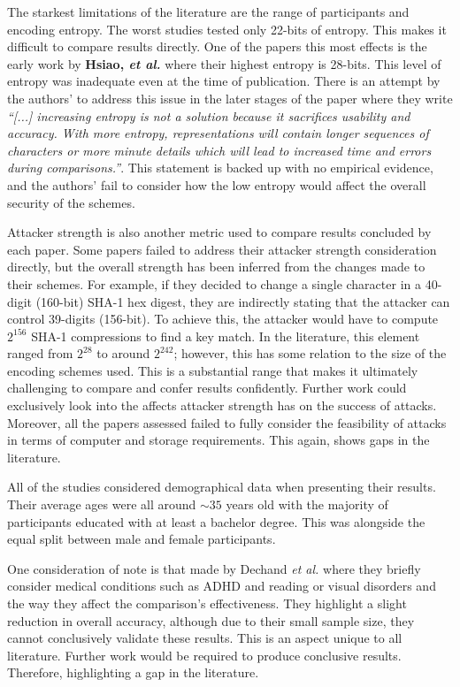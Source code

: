 The starkest limitations of the literature are the range of participants and encoding entropy. The worst studies tested only 22-bits of entropy. This makes it difficult to compare results directly. One of the papers this most effects is the early work by \textbf{Hsiao, \textit{et al.}}\cite{hsiao2009study}  where their highest entropy is 28-bits. This level of entropy was inadequate even at the time of publication. There is an attempt by the authors' to address this issue in the later stages of the paper where they write \textit{``[...] increasing entropy is not a solution because it sacrifices usability and accuracy. With more entropy, representations will contain longer sequences of characters or more minute details which will lead to increased time and errors during comparisons.''}. This statement is backed up with no empirical evidence, and the authors' fail to consider how the low entropy would affect the overall security of the schemes.

Attacker strength is also another metric used to compare results concluded by each paper. Some papers failed to address their attacker strength consideration directly, but the overall strength has been inferred from the changes made to their schemes. For example, if they decided to change a single character in a 40-digit (160-bit) SHA-1 hex digest, they are indirectly stating that the attacker can control 39-digits (156-bit). To achieve this, the attacker would have to compute $2^{156}$ SHA-1 compressions to find a key match.
In the literature, this element ranged from $2^{28}$ to around $2^{242}$; however, this has some relation to the size of the encoding schemes used. This is a substantial range that makes it ultimately challenging to compare and confer results confidently. Further work could exclusively look into the affects attacker strength has on the success of attacks. Moreover, all the papers assessed failed to fully consider the feasibility of attacks in terms of computer and storage requirements. This again, shows gaps in the literature. 

All of the studies considered demographical data when presenting their results. Their average ages were all around $\sim35$ years old with the majority of participants educated with at least a bachelor degree. This was alongside the equal split between male and female participants.

One consideration of note is that made by Dechand \textit{et al.} \cite{dechand2016empirical} where they briefly consider medical conditions such as ADHD and reading or visual disorders and the way they affect the comparison's effectiveness. They highlight a slight reduction in overall accuracy, although due to their small sample size, they cannot conclusively validate these results. This is an aspect unique to all literature. Further work would be required to produce conclusive results. Therefore, highlighting a gap in the literature.

